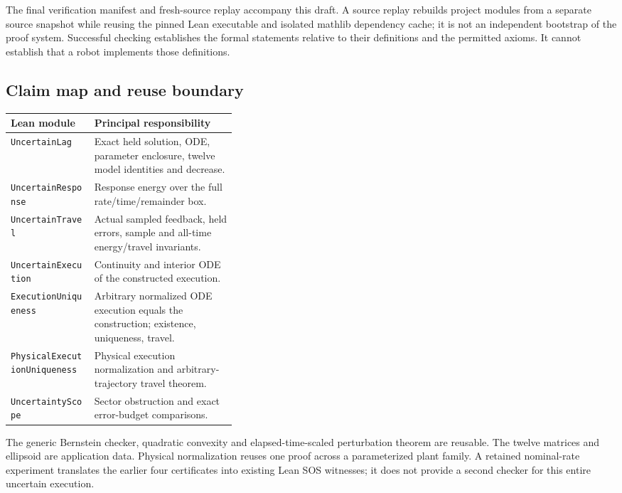 \documentclass[10pt]{article}
\newcommand{\code}[1]{\texttt{#1}}
\begin{document}
The final verification manifest and fresh-source replay accompany this draft. A source replay rebuilds project modules from a separate source snapshot while reusing the pinned Lean executable and isolated mathlib dependency cache; it is not an independent bootstrap of the proof system. Successful checking establishes the formal statements relative to their definitions and the permitted axioms. It cannot establish that a robot implements those definitions.

\subsection{Claim map and reuse boundary}
\begin{center}\small
\begin{tabularx}{\linewidth}{@{}>{\raggedright\arraybackslash}p{0.37\linewidth}X@{}}
\toprule
Lean module & Principal responsibility\\\midrule
\code{UncertainLag} & Exact held solution, ODE, parameter enclosure, twelve model identities and decrease.\\
\code{UncertainResponse} & Response energy over the full rate/time/remainder box.\\
\code{UncertainTravel} & Actual sampled feedback, held errors, sample and all-time energy/travel invariants.\\
\code{UncertainExecution} & Continuity and interior ODE of the constructed execution.\\
\code{ExecutionUniqueness} & Arbitrary normalized ODE execution equals the construction; existence, uniqueness, travel.\\
\code{PhysicalExecutionUniqueness} & Physical execution normalization and arbitrary-trajectory travel theorem.\\
\code{UncertaintyScope} & Sector obstruction and exact error-budget comparisons.\\\bottomrule
\end{tabularx}
\end{center}
The generic Bernstein checker, quadratic convexity and elapsed-time-scaled perturbation theorem are reusable. The twelve matrices and ellipsoid are application data. Physical normalization reuses one proof across a parameterized plant family. A retained nominal-rate experiment translates the earlier four certificates into existing Lean SOS witnesses; it does not provide a second checker for this entire uncertain execution.
\end{document}
